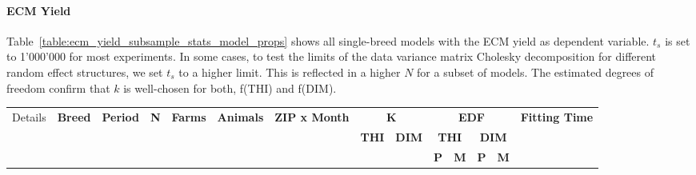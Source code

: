 \begin{landscape} %
    \thispagestyle{empty}
    \paragraph{ECM Yield} Table~\ref{table:ecm_yield_subsample_stats_model_props} shows all single-breed models with the ECM yield as dependent variable. $t_s$ is set to 1'000'000 for most experiments. In some cases, to test the limits of the data variance matrix Cholesky decomposition for different random effect structures, we set $t_s$ to a higher limit. This is reflected in a higher $N$ for a subset of models. The estimated degrees of freedom confirm that $k$ is well-chosen for both, f(THI) and f(DIM).
    \begin{table}[htbp]
        \centering
        \begin{tabular}{c c r r r r c c c c c c c r}
            \toprule
            \multirow{3}{*}{Details} &
            \multirow{3}{*}{\textbf{Breed}} &
            \multirow{3}{*}{\textbf{Period}} &
            \multirow{3}{*}{\textbf{N}} &
            \multirow{3}{*}{\textbf{Farms}} &
            \multirow{3}{*}{\textbf{Animals}} &
            \multirow{3}{*}{\textbf{ZIP x Month}} &
            \multicolumn{2}{c}{\textbf{K}} &
            \multicolumn{4}{c}{\textbf{EDF}} &
            \multirow{3}{*}{\textbf{Fitting Time}} \\
            \cmidrule(lr){8-9} \cmidrule(lr){10-13}
            & & & & & & &
            \textbf{THI} & \textbf{DIM} &
            \multicolumn{2}{c}{\textbf{THI}} &
            \multicolumn{2}{c}{\textbf{DIM}} \\
            \cmidrule(lr){10-11} \cmidrule(lr){12-13}
            & & & & & & & & & \textbf{P} & \textbf{M} & \textbf{P} & \textbf{M} &\\
            \hline
            \hline
            

\end{tabular}
\end{table}
\end{landscape}
